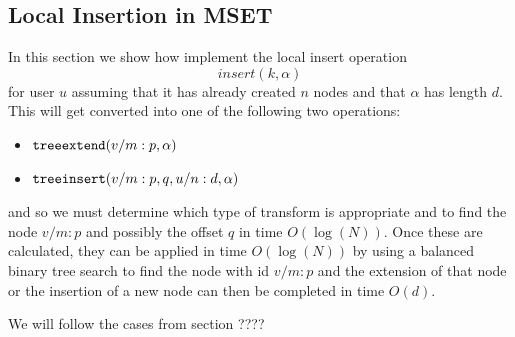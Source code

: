 \documentclass{amsart}
\begin{document}
\subsection{Local Insertion in MSET}

In this section we show how implement the local insert operation 
\[
insert(k,\alpha)
\]
for user $u$ assuming that it has already created $n$ nodes and that $\alpha$ has length $d$. This will get converted into one of the following two operations:
\begin{itemize}
\item ${\tt treeextend}(v/m:p,\alpha)$ 
\item ${\tt treeinsert}(v/m:p,q,u/n:d,\alpha) $
\end{itemize}
and so we must determine which type of transform is appropriate and to find the node $v/m:p$ and possibly the offset $q$ 
in time $O(\log(N))$.
Once these are calculated, they can be applied in time $O(\log(N))$ by using
a balanced binary tree search to find the node with id $v/m:p$ and the extension
of that node or the insertion of a new node can then be completed in time $O(d)$.


%


We will follow the cases from section ????
\end{document}
